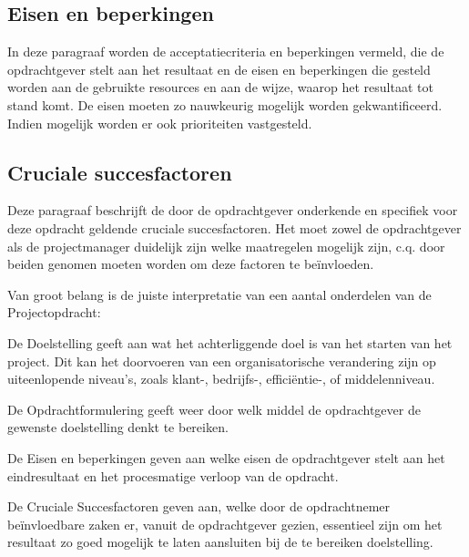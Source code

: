 \subsection{Eisen en beperkingen}
In deze paragraaf worden de acceptatiecriteria en beperkingen vermeld,
die de opdrachtgever stelt aan het resultaat en de eisen en beperkingen die gesteld worden aan de gebruikte resources en aan de wijze,
waarop het resultaat tot stand komt.
De eisen moeten zo nauwkeurig mogelijk worden gekwantificeerd.
Indien mogelijk worden er ook prioriteiten vastgesteld.

\subsection{Cruciale succesfactoren}
Deze paragraaf beschrijft de door de opdrachtgever onderkende en specifiek voor deze opdracht geldende cruciale succesfactoren.
Het moet zowel de opdrachtgever als de projectmanager duidelijk zijn welke maatregelen mogelijk zijn,
c.q. door beiden genomen moeten worden om deze factoren te be\"invloeden.


Van groot belang is de juiste interpretatie van een aantal onderdelen van de Projectopdracht:

De Doelstelling geeft aan wat het achterliggende doel is van het starten van het project.
Dit kan het doorvoeren van een organisatorische verandering zijn op uiteenlopende niveau's,
zoals klant-, bedrijfs-, effici\"entie-, of middelenniveau.

De Opdrachtformulering geeft weer door welk middel de opdrachtgever de gewenste doelstelling denkt te bereiken.

De Eisen en beperkingen geven aan welke eisen de opdrachtgever stelt aan het eindresultaat en het procesmatige verloop van de opdracht.

De Cruciale Succesfactoren geven aan,  welke door de opdrachtnemer be\"invloedbare zaken er, vanuit de opdrachtgever gezien, essentieel zijn om het resultaat zo goed mogelijk te laten aansluiten bij de te bereiken doelstelling.

